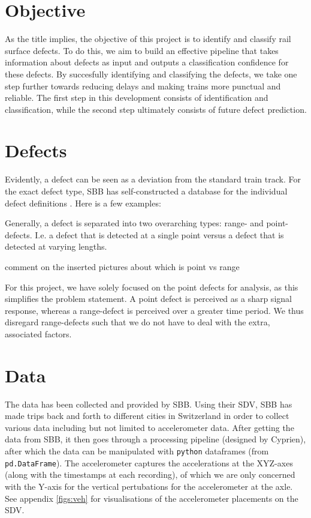 \section{Objective}
As the title implies, the objective of this project is to identify and classify rail surface defects. To do this, we aim to build an effective pipeline that takes information about defects as input and outputs a classification confidence for these defects. By succesfully identifying and classifying the defects, we take one step further towards reducing delays and making trains more punctual and reliable. The first step in this development consists of identification and classification, while the second step ultimately consists of future defect prediction.

\section{Defects}
Evidently, a defect can be seen as a deviation from the standard train track. For the exact defect type, SBB has self-constructed a database for the individual defect definitions . Here is a few examples: 


Generally, a defect is separated into two overarching types: range- and point-defects. I.e. a defect that is detected at a single point versus a defect that is detected at varying lengths.

comment on the inserted pictures about which is point vs range

For this project, we have solely focused on the point defects for analysis, as this simplifies the problem statement. A point defect is perceived as a sharp signal response, whereas a range-defect is perceived over a greater time period. We thus disregard range-defects such that we do not have to deal with the extra, associated factors. 



\section{Data}
The data has been collected and provided by SBB. Using their SDV, SBB has made trips back and forth to different cities in Switzerland in order to collect various data including but not limited to accelerometer data. After getting the data from SBB, it then goes through a processing pipeline (designed by Cyprien), after which the data can be manipulated with \verb|python| dataframes (from \verb|pd.DataFrame|). The accelerometer captures the accelerations at the XYZ-axes (along with the timestamps at each recording), of which we are only concerned with the Y-axis for the vertical pertubations for the accelerometer at the axle. See appendix \ref{figs:veh} for visualisations of the accelerometer placements on the SDV.

